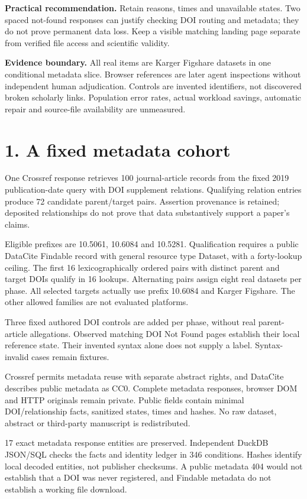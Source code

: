 \documentclass[11pt]{article}
\newcommand{\MSourceItems}{100}
\newcommand{\MCandidates}{72}
\newcommand{\MLookups}{16}
\newcommand{\MRealPairs}{16}
\newcommand{\MSourceFiles}{17}
\newcommand{\MNativeChecks}{346}
\begin{document}
\textbf{Practical recommendation.} Retain reasons, times and unavailable states. Two spaced not-found responses can justify checking DOI routing and metadata; they do not prove permanent data loss. Keep a visible matching landing page separate from verified file access and scientific validity.

\textbf{Evidence boundary.} All real items are Karger Figshare datasets in one conditional metadata slice. Browser references are later agent inspections without independent human adjudication. Controls are invented identifiers, not discovered broken scholarly links. Population error rates, actual workload savings, automatic repair and source-file availability are unmeasured.
\newpage
\section*{1. A fixed metadata cohort}
One Crossref response retrieves \MSourceItems{} journal-article records from the fixed 2019 publication-date query with DOI supplement relations. Qualifying relation entries produce \MCandidates{} candidate parent/target pairs. Assertion provenance is retained; deposited relationships do not prove that data substantively support a paper's claims.

Eligible prefixes are 10.5061, 10.6084 and 10.5281. Qualification requires a public DataCite Findable record with general resource type Dataset, with a forty-lookup ceiling. The first \MRealPairs{} lexicographically ordered pairs with distinct parent and target DOIs qualify in \MLookups{} lookups. Alternating pairs assign eight real datasets per phase. All selected targets actually use prefix 10.6084 and Karger Figshare. The other allowed families are not evaluated platforms.

Three fixed authored DOI controls are added per phase, without real parent-article allegations. Observed matching DOI Not Found pages establish their local reference state. Their invented syntax alone does not supply a label. Syntax-invalid cases remain fixtures.

Crossref permits metadata reuse with separate abstract rights, and DataCite describes public metadata as CC0. Complete metadata responses, browser DOM and HTTP originals remain private. Public fields contain minimal DOI/relationship facts, sanitized states, times and hashes. No raw dataset, abstract or third-party manuscript is redistributed.

\MSourceFiles{} exact metadata response entities are preserved. Independent DuckDB JSON/SQL checks the facts and identity ledger in \MNativeChecks{} conditions. Hashes identify local decoded entities, not publisher checksums. A public metadata 404 would not establish that a DOI was never registered, and Findable metadata do not establish a working file download.
\end{document}
